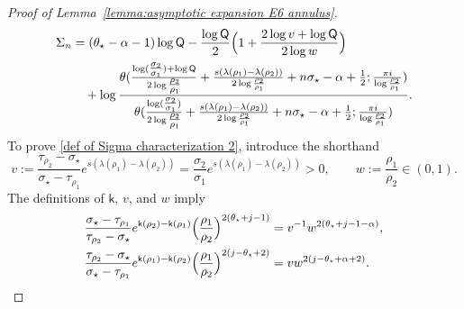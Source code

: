 \documentclass[a4paper]{article}
\numberwithin{equation}{section}
\begin{document}
\begin{proof}[Proof of Lemma~\ref{lemma:asymptotic expansion E6 annulus}]
\begin{align}
\begin{split}
\label{def of Sigma characterization 2}
\Sigma_n
&=
(\theta_{\star}-\alpha-1)\log\mathsf{Q}-\frac{\log \mathsf{Q}}{2}\Bigl(1+\frac{2\log v+\log \mathsf{Q}}{2\log w}\Bigr)
    \\
    &\quad 
    +\log \frac{\theta( \tfrac{\log (\tfrac{\sigma_2}{\sigma_1})+\log \mathsf{Q}}{2\log \tfrac{\rho_2}{\rho_1}}+\frac{s(\lambda(\rho_1)-\lambda(\rho_2))}{2\log\frac{\rho_2}{\rho_1}}+n\sigma_{\star}-\alpha +\frac{1}{2}; \frac{\pi i }{\log \frac{\rho_2}{\rho_1}})}{\theta( \tfrac{\log (\tfrac{\sigma_2}{\sigma_1})}{2\log \tfrac{\rho_2}{\rho_1}}+\frac{s(\lambda(\rho_1)-\lambda(\rho_2))}{2\log\frac{\rho_2}{\rho_1}}+n\sigma_{\star}-\alpha+\frac{1}{2}; \frac{\pi i }{\log \frac{\rho_2}{\rho_1}})}.     
\end{split}    
\end{align}
To prove \eqref{def of Sigma characterization 2}, introduce the shorthand
\[
v:=\frac{\tau_{\rho_2}-\sigma_{\star}}{\sigma_{\star}-\tau_{\rho_1}}
e^{s(\lambda(\rho_1)-\lambda(\rho_2))}=\frac{\sigma_2}{\sigma_1}e^{s(\lambda(\rho_1)-\lambda(\rho_2))}>0,\qquad
w:=\frac{\rho_1}{\rho_2}\in(0,1).
\]
The definitions of $\mathsf k$, $v$, and $w$ imply
\begin{align*}
&\frac{\sigma_{\star}-\tau_{\rho_1}}{\tau_{\rho_2}-\sigma_{\star}}
e^{\mathsf{k}(\rho_2)-\mathsf{k}(\rho_1)}
\Bigl(\frac{\rho_1}{\rho_2}\Bigr)^{2(\theta_{\star}+j-1)}
=v^{-1}w^{2(\theta_{\star}+j-1-\alpha)},
\\
&\frac{\tau_{\rho_2}-\sigma_{\star}}{\sigma_{\star}-\tau_{\rho_1}}
e^{\mathsf{k}(\rho_1)-\mathsf{k}(\rho_2)}
\Bigl(\frac{\rho_1}{\rho_2}\Bigr)^{2(j-\theta_{\star}+2)}
=v w^{2(j-\theta_{\star}+\alpha+2)}.
\end{align*}

\end{proof}
\end{document}
